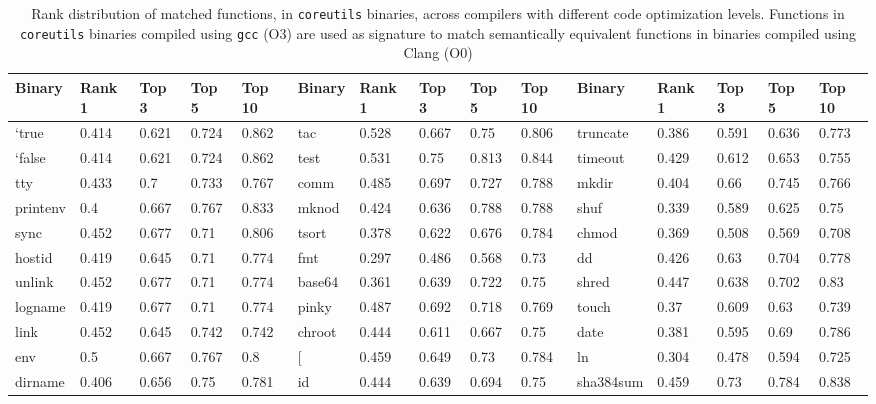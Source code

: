 \begin{table*}[h!]
	\begin{center}
		\caption{Rank distribution of matched functions, in \texttt{coreutils} binaries, across compilers with different code optimization levels. Functions in \texttt{coreutils} binaries compiled using \texttt{gcc} (O3) are used as signature to match semantically  equivalent functions in binaries compiled using Clang (O0)\\}
		\label{tab:x86_gcc_O3_clang_O0}
		\scriptsize

\begin{tabular}{ | l | l | l | l | l | l | l | l | l | l | l | l | l | l | l | }
\hline
	Binary & Rank 1 & Top 3 & Top 5 & Top 10 & Binary & Rank 1 & Top 3 & Top 5 & Top 10 & Binary & Rank 1 & Top 3 & Top 5 & Top 10 \\ \hline
	`true & 0.414 & 0.621 & 0.724 & 0.862 & tac & 0.528 & 0.667 & 0.75 & 0.806 & truncate & 0.386 & 0.591 & 0.636 & 0.773 \\ \hline
	`false & 0.414 & 0.621 & 0.724 & 0.862 & test & 0.531 & 0.75 & 0.813 & 0.844 & timeout & 0.429 & 0.612 & 0.653 & 0.755 \\ \hline
	tty & 0.433 & 0.7 & 0.733 & 0.767 & comm & 0.485 & 0.697 & 0.727 & 0.788 & mkdir & 0.404 & 0.66 & 0.745 & 0.766 \\ \hline
	printenv & 0.4 & 0.667 & 0.767 & 0.833 & mknod & 0.424 & 0.636 & 0.788 & 0.788 & shuf & 0.339 & 0.589 & 0.625 & 0.75 \\ \hline
	sync & 0.452 & 0.677 & 0.71 & 0.806 & tsort & 0.378 & 0.622 & 0.676 & 0.784 & chmod & 0.369 & 0.508 & 0.569 & 0.708 \\ \hline
	hostid & 0.419 & 0.645 & 0.71 & 0.774 & fmt & 0.297 & 0.486 & 0.568 & 0.73 & dd & 0.426 & 0.63 & 0.704 & 0.778 \\ \hline
	unlink & 0.452 & 0.677 & 0.71 & 0.774 & base64 & 0.361 & 0.639 & 0.722 & 0.75 & shred & 0.447 & 0.638 & 0.702 & 0.83 \\ \hline
	logname & 0.419 & 0.677 & 0.71 & 0.774 & pinky & 0.487 & 0.692 & 0.718 & 0.769 & touch & 0.37 & 0.609 & 0.63 & 0.739 \\ \hline
	link & 0.452 & 0.645 & 0.742 & 0.742 & chroot & 0.444 & 0.611 & 0.667 & 0.75 & date & 0.381 & 0.595 & 0.69 & 0.786 \\ \hline
	env & 0.5 & 0.667 & 0.767 & 0.8 & [ & 0.459 & 0.649 & 0.73 & 0.784 & ln & 0.304 & 0.478 & 0.594 & 0.725 \\ \hline
	dirname & 0.406 & 0.656 & 0.75 & 0.781 & id & 0.444 & 0.639 & 0.694 & 0.75 & sha384sum & 0.459 & 0.73 & 0.784 & 0.838 \\ \hline

\end{tabular}
\end{center}
\end{table*}
